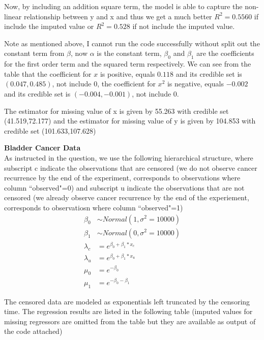 \documentclass{homeworg}
\begin{document}
Now, by including an addition square term, the model is able to capture the non-linear relationship between y and x and thus we get a much better $R^2=0.5560$ if include the imputed value or $R^2=0.528$ if not include the imputed value.

Note as mentioned above, I cannot run the code successfully without split out the constant term from $\beta$, now $\alpha$ is the constant term, $\beta_0$ and $\beta_1$ are the coefficients for the first order term and the squared term respectively. We can see from the table that the coefficient for $x$ is positive, equals $0.118$ and its credible set is $(0.047,0.485)$, not include 0, the coefficient for $x^2$ is negative, equals $-0.002$ and its credible set is $(-0.004,-0.001)$, not include 0. 

The estimator for missing value of x is given by 55.263 with credible set (41.519,72.177) and the estimator for missing value of y is given by 104.853 with credible set (101.633,107.628)





\exercise 
\textbf{Bladder Cancer Data} \\
As instructed in the question, we use the following hierarchical structure, where subscript c indicate the observations that are censored (we do not observe cancer recurrence by the end of the experiment, corresponds to observations where column ``observed"=0) and subscript u indicate the observations that are not censored (we already observe cancer recurrence by the end of the experiement, corresponds to observatiosn where column ``observed"=1)
\begin{align*}
\beta_0 & \sim Normal(1,\sigma^2=10000) \\
\beta_1 & \sim Normal(0,\sigma^2=10000) \\
\lambda_c&=e^{\beta_0+\beta_1*x_c} \\
\lambda_u&=e^{\beta_0+\beta_1*x_u} \\
\mu_0&=e^{-\beta_0}\\
\mu_1&=e^{-\beta_0-\beta_1}
\end{align*}

The censored data are modeled as exponentials left truncated by the censoring time. The regression results are listed in the following table (imputed values for missing regressors are omitted from the table but they are available as output of the code attached)\\
\end{document}
